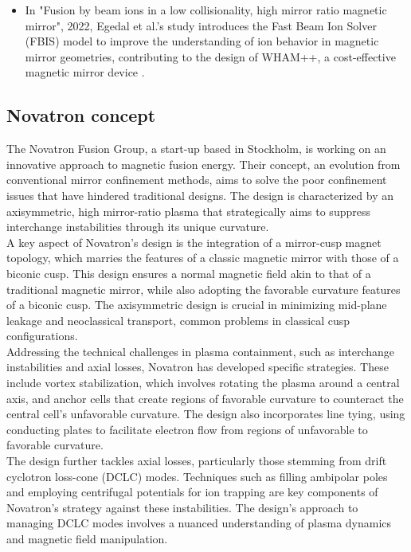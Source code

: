\begin{itemize}
 \item In "Fusion by beam ions in a low collisionality, high mirror ratio magnetic mirror", 2022, Egedal et al.'s study introduces the Fast Beam Ion Solver (FBIS) model to improve the understanding of ion behavior in magnetic mirror geometries, contributing to the design of WHAM++, a cost-effective magnetic mirror device \cite{egedal2022fusion}.

\end{itemize}
\label{MIF_lit_review}

\subsection{Novatron concept}

The Novatron Fusion Group, a start-up based in Stockholm, is working on an innovative approach to magnetic fusion energy. Their concept, an evolution from conventional mirror confinement methods, aims to solve the poor confinement issues that have hindered traditional designs. The design is characterized by an axisymmetric, high mirror-ratio plasma that strategically aims to suppress interchange instabilities through its unique curvature.\\

A key aspect of Novatron's design is the integration of a mirror-cusp magnet topology, which marries the features of a classic magnetic mirror with those of a biconic cusp. This design ensures a normal magnetic field akin to that of a traditional magnetic mirror, while also adopting the favorable curvature features of a biconic cusp. The axisymmetric design is crucial in minimizing mid-plane leakage and neoclassical transport, common problems in classical cusp configurations.\\

Addressing the technical challenges in plasma containment, such as interchange instabilities and axial losses, Novatron has developed specific strategies. These include vortex stabilization, which involves rotating the plasma around a central axis, and anchor cells that create regions of favorable curvature to counteract the central cell's unfavorable curvature. The design also incorporates line tying, using conducting plates to facilitate electron flow from regions of unfavorable to favorable curvature.\\

The design further tackles axial losses, particularly those stemming from drift cyclotron loss-cone (DCLC) modes. Techniques such as filling ambipolar poles and employing centrifugal potentials for ion trapping are key components of Novatron's strategy against these instabilities. The design's approach to managing DCLC modes involves a nuanced understanding of plasma dynamics and magnetic field manipulation.\\

